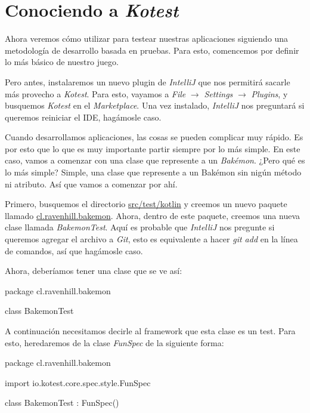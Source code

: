 \section{Conociendo a \textit{Kotest}}
\label{sec:conociendo-kotest}

  Ahora veremos cómo utilizar  para testear nuestras aplicaciones siguiendo una
  metodología de desarrollo basada en pruebas.
  Para esto, comencemos por definir lo más básico de nuestro juego.

  Pero antes, instalaremos un nuevo plugin de \textit{IntelliJ} que nos permitirá sacarle más 
  provecho a \textit{Kotest}.
  Para esto, vayamos a \textit{File} $\rightarrow$ \textit{Settings} $\rightarrow$ \textit{Plugins},
  y busquemos \textit{Kotest} en el \textit{Marketplace}.
  Una vez instalado, \textit{IntelliJ} nos preguntará si queremos reiniciar el IDE, hagámosle caso.

  Cuando desarrollamos aplicaciones, las cosas se pueden complicar muy rápido.
  Es por esto que lo que es muy importante partir siempre por lo más simple.
  En este caso, vamos a comenzar con una clase que represente a un \textit{Bakémon}.
  ¿Pero qué es lo más simple?
  Simple, una clase que represente a un Bakémon sin nigún método ni atributo.
  Así que vamos a comenzar por ahí.

  Primero, busquemos el directorio \url{src/test/kotlin} y creemos un nuevo paquete llamado 
  \url{cl.ravenhill.bakemon}.
  Ahora, dentro de este paquete, creemos una nueva clase llamada \textit{BakemonTest}.
  Aquí es probable que \textit{IntelliJ} nos pregunte si queremos agregar el archivo a \textit{Git},
  esto es equivalente a hacer \textit{git add} en la línea de comandos, así que hagámosle caso.

  Ahora, deberíamos tener una clase que se ve así:

  \begin{kotlin}
    package cl.ravenhill.bakemon

    class BakemonTest {
    }
  \end{kotlin}

  A continuación necesitamos decirle al framework que esta clase es un test.
  Para esto, heredaremos de la clase \textit{FunSpec} de la siguiente forma:

  \begin{kotlin}
    package cl.ravenhill.bakemon

    import io.kotest.core.spec.style.FunSpec

    class BakemonTest : FunSpec({})
  \end{kotlin}

